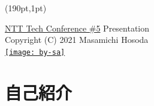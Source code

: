 \begin{frame}
  \titlepage
  \begin{textblock*}{0.5\linewidth}(190pt,1pt)
    \begin{flushright}
      \tiny
      \href{https://ntt-developers.github.io/ntt-tech-conference/05/}%
           {NTT Tech Conference \#5} Presentation \\
      Copyright (C) 2021 Masamichi Hosoda \\
      \href{https://creativecommons.org/licenses/by-sa/4.0/deed.ja}%
           {\texttt{[image: by-sa]}}
    \end{flushright}
  \end{textblock*}
\end{frame}

\section*{自己紹介}
